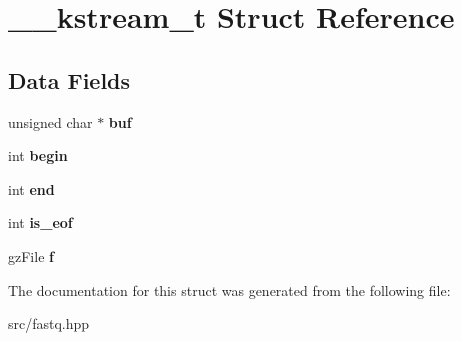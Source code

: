 \hypertarget{struct____kstream__t}{}\section{\+\_\+\+\_\+kstream\+\_\+t Struct Reference}
\label{struct____kstream__t}
\subsection*{Data Fields}
\begin{DoxyCompactItemize}
\item 
\mbox{\label{struct____kstream__t_acffa36492f1300d9647724519b5e1db5}} 
unsigned char $\ast$ {\bfseries buf}
\item 
\mbox{\label{struct____kstream__t_a484e9bce3952565e2c8464d27b448857}} 
int {\bfseries begin}
\item 
\mbox{\label{struct____kstream__t_a491b3ffce4fe1b4a51b75f40e16abe3e}} 
int {\bfseries end}
\item 
\mbox{\label{struct____kstream__t_a7bddc6a7f0553d685e2fe3bff17351ea}} 
int {\bfseries is\+\_\+eof}
\item 
\mbox{\label{struct____kstream__t_aa155ac57804d73e3442aa3f3155b4d05}} 
gz\+File {\bfseries f}
\end{DoxyCompactItemize}


The documentation for this struct was generated from the following file\+:\begin{DoxyCompactItemize}
\item 
src/fastq.\+hpp\end{DoxyCompactItemize}
